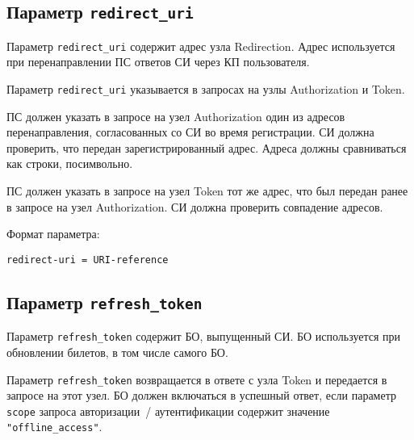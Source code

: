\subsection{Параметр \lstinline{redirect_uri}}\label{PARAMS.RedirectUri}

Параметр \lstinline{redirect_uri} содержит адрес узла Redirection.
Адрес используется при перенаправлении ПС ответов СИ через КП пользователя.

Параметр \lstinline{redirect_uri} указывается в запросах на узлы Authorization 
и Token.

ПС должен указать в запросе на узел Authorization один из адресов перенаправления, 
согласованных со СИ во время регистрации. СИ должна проверить, что передан 
зарегистрированный адрес. Адреса должны сравниваться как строки, посимвольно.

ПС должен указать в запросе на узел Token тот же адрес, что был передан ранее 
в запросе на узел Authorization. СИ должна проверить совпадение адресов.

Формат параметра:
\begin{lstlisting}
redirect-uri = URI-reference
\end{lstlisting}



\subsection{Параметр \lstinline{refresh_token}}\label{PARAMS.RefreshToken} 

Параметр \lstinline{refresh_token} содержит БО, выпущенный СИ.
БО используется при обновлении билетов, в том числе самого БО.

Параметр \lstinline{refresh_token} возвращается в ответе с узла Token и 
передается в запросе на этот узел.
%
БО должен включаться в успешный ответ, если параметр \lstinline{scope} 
запроса авторизации~/ аутентификации содержит значение 
\lstinline{"offline_access"}. 

